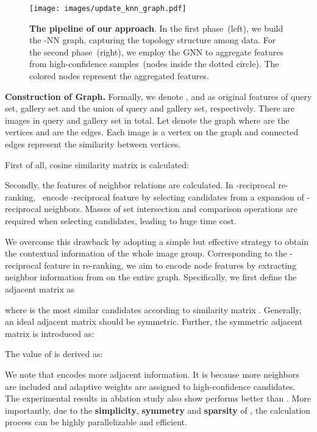 \documentclass[10pt,twocolumn,letterpaper]{article}
\begin{document}
\begin{figure}[t]
\begin{center}
   \texttt{[image: images/update\_knn\_graph.pdf]}
\end{center}
   \caption{\textbf{The pipeline of our approach}.
   In the first phase~(left),  we build the -NN graph, capturing the topology structure among data. For the second phase~(right), we employ the GNN to aggregate features from high-confidence samples~(nodes inside the dotted circle). The colored nodes represent the aggregated features.
   }
\label{fig:pipeline}
\end{figure}

\noindent  \textbf{Construction of Graph.}
Formally, we denote ,  and  as original features of query set, gallery set and the union of query and gallery set, respectively. There are  images in query and gallery set in total. 
Let  denote the graph where  are the vertices and  are the edges. Each image is a vertex on the graph and connected edges represent the similarity between vertices.

First of all, cosine similarity matrix  is calculated:

Secondly, the features of neighbor relations are calculated.  
In -reciprocal re-ranking,~\cite{zhong2017re} encode -reciprocal feature by selecting candidates from a expansion of -reciprocal neighbors. Masses of set intersection and comparison operations are required when selecting candidates, leading to huge time cost. 

We overcome this drawback by adopting a simple but effective strategy to obtain the contextual information of the whole image group. Corresponding to the -reciprocal feature in re-ranking, we aim to encode node features by extracting neighbor information from  on the entire graph. Specifically, we first define the adjacent matrix  as

where   is the  most similar candidates according to similarity matrix . 
Generally, an ideal adjacent matrix should be symmetric.
Further, the symmetric adjacent matrix  is introduced as:

The value of  is derived as:

We note that  encodes more adjacent information. It is because more neighbors are included and adaptive weights are assigned to high-confidence candidates. The experimental results in ablation study also show  performs better than . More importantly, due to the \textbf{simplicity}, \textbf{symmetry} and \textbf{sparsity} of , the calculation process can be highly parallelizable and efficient.
\end{document}
